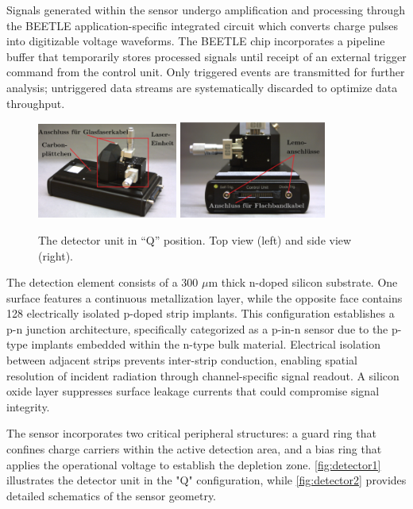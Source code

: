 Signals generated within the sensor undergo amplification and processing through the BEETLE application-specific integrated circuit which converts charge pulses into digitizable voltage waveforms. The BEETLE chip incorporates a pipeline buffer that temporarily stores processed signals until receipt of an external trigger command from the control unit. Only triggered events are transmitted for further analysis; untriggered data streams are systematically discarded to optimize data throughput.

\begin{figure}[H]
	\centering
        \includegraphics[width=0.41\textwidth]{pictures/detector1.png}
        \includegraphics[width=0.43\textwidth]{pictures/detector2.png}
	\caption{The detector unit in \enquote{Q} position. Top view (left) and side view (right).}
        \label{fig:detector1}   
\end{figure}

The detection element consists of a 300 $\mu$m thick n-doped silicon substrate. One surface features a continuous metallization layer, while the opposite face contains 128 electrically isolated p-doped strip implants. This configuration establishes a p-n junction architecture, specifically categorized as a p-in-n sensor due to the p-type implants embedded within the n-type bulk material. Electrical isolation between adjacent strips prevents inter-strip conduction, enabling spatial resolution of incident radiation through channel-specific signal readout. A silicon oxide layer suppresses surface leakage currents that could compromise signal integrity.

The sensor incorporates two critical peripheral structures: a guard ring that confines charge carriers within the active detection area, and a bias ring that applies the operational voltage to establish the depletion zone. \autoref{fig:detector1} illustrates the detector unit in the "Q" configuration, while \autoref{fig:detector2} provides detailed schematics of the sensor geometry.

